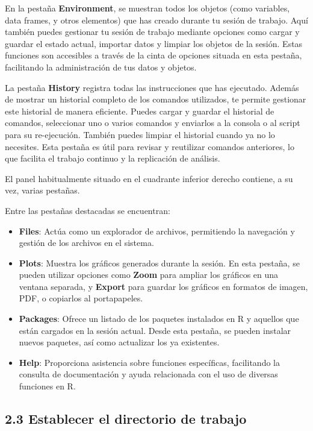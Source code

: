 \documentclass[
  letterpaper,
]{scrbook}
\begin{document}
En la pestaña \textbf{Environment}, se muestran todos los objetos (como
variables, data frames, y otros elementos) que has creado durante tu
sesión de trabajo. Aquí también puedes gestionar tu sesión de trabajo
mediante opciones como cargar y guardar el estado actual, importar datos
y limpiar los objetos de la sesión. Estas funciones son accesibles a
través de la cinta de opciones situada en esta pestaña, facilitando la
administración de tus datos y objetos.

La pestaña \textbf{History} registra todas las instrucciones que has
ejecutado. Además de mostrar un historial completo de los comandos
utilizados, te permite gestionar este historial de manera eficiente.
Puedes cargar y guardar el historial de comandos, seleccionar uno o
varios comandos y enviarlos a la consola o al script para su
re-ejecución. También puedes limpiar el historial cuando ya no lo
necesites. Esta pestaña es útil para revisar y reutilizar comandos
anteriores, lo que facilita el trabajo continuo y la replicación de
análisis.

El panel habitualmente situado en el cuadrante inferior derecho
contiene, a su vez, varias pestañas.

Entre las pestañas destacadas se encuentran:

\begin{itemize}
\item
  \textbf{Files}: Actúa como un explorador de archivos, permitiendo la
  navegación y gestión de los archivos en el sistema.
\item
  \textbf{Plots}: Muestra los gráficos generados durante la sesión. En
  esta pestaña, se pueden utilizar opciones como \textbf{Zoom} para
  ampliar los gráficos en una ventana separada, y \textbf{Export} para
  guardar los gráficos en formatos de imagen, PDF, o copiarlos al
  portapapeles.
\item
  \textbf{Packages}: Ofrece un listado de los paquetes instalados en R y
  aquellos que están cargados en la sesión actual. Desde esta pestaña,
  se pueden instalar nuevos paquetes, así como actualizar los ya
  existentes.
\item
  \textbf{Help}: Proporciona asistencia sobre funciones específicas,
  facilitando la consulta de documentación y ayuda relacionada con el
  uso de diversas funciones en R.
\end{itemize}

\hypertarget{establecer-el-directorio-de-trabajo}{%
\subsection{2.3 Establecer el directorio de
trabajo}\label{establecer-el-directorio-de-trabajo}}
\end{document}
